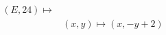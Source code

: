 \documentclass[preview]{standalone}
\begin{document}
\begin{align*}
(E,24) \mapsto \\& (x,y) \mapsto (x, -y + 2)
\end{align*}
\end{document}
